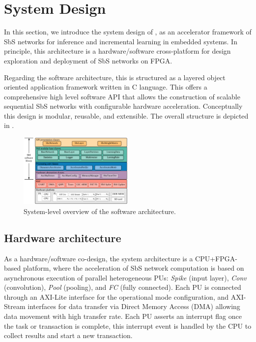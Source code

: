 \section{System Design}
\label{sec:system_design}
In this section, we introduce the system design of \cite{nevarez2020accelerator}, as an accelerator framework of SbS networks for inference and incremental learning in embedded systems. In principle, this architecture is a hardware/software cross-platform for design exploration and deployment of SbS networks on FPGA. 

Regarding the software architecture, this is structured as a layered object oriented application framework written in C language. This offers a comprehensive high level software API that allows the construction of scalable sequential SbS networks with configurable hardware acceleration. Conceptually this design is modular, reusable, and extensible. The overall structure is depicted in .

\begin{figure}
	\centering
	\includegraphics[width=0.5\textwidth]{../figures/sbs_software_component.pdf}
	\caption{System-level overview of the software architecture.}
	\label{fig:sw_stack}
\end{figure}

\subsection{Hardware architecture} \label{Hardware_architecture}
As a hardware/software co-design, the system architecture is a CPU+FPGA-based platform, where the acceleration of SbS network computation is based on asynchronous execution of parallel heterogeneous PUs: \emph{Spike} (input layer), \emph{Conv} (convolution), \emph{Pool} (pooling), and \emph{FC} (fully connected). Each PU is connected through an AXI-Lite interface for the operational mode configuration, and AXI-Stream interfaces for data transfer via Direct Memory Access (DMA) allowing data movement with high transfer rate. Each PU asserts an interrupt flag once the task or transaction is complete, this interrupt event is handled by the CPU to collect results and start a new transaction.

